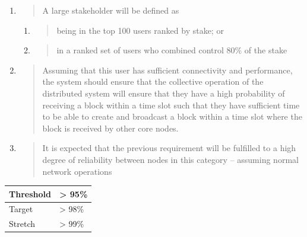 \documentclass[]{article}
\begin{document}
\begin{enumerate}
\def\labelenumi{\arabic{enumi}.}
\item
  \begin{quote}
  A large stakeholder will be defined as
  \end{quote}

  \begin{enumerate}
  \def\labelenumii{\alph{enumii}.}
  \item
    \begin{quote}
    being in the top 100 users ranked by stake; or
    \end{quote}
  \item
    \begin{quote}
    in a ranked set of users who combined control 80\% of the stake
    \end{quote}
  \end{enumerate}
\item
  \begin{quote}
  Assuming that this user has sufficient connectivity and performance,
  the system should ensure that the collective operation of the
  distributed system will ensure that they have a high probability of
  receiving a block within a time slot such that they have sufficient
  time to be able to create and broadcast a block within a time slot
  where the block is received by other core nodes.
  \end{quote}
\item
  \begin{quote}
  It is expected that the previous requirement will be fulfilled to a
  high degree of reliability between nodes in this category -- assuming
  normal network operations
  \end{quote}
\end{enumerate}

\begin{longtable}[]{@{}ll@{}}
\toprule
Threshold & \textgreater{} 95\%\tabularnewline
\midrule
\endhead
Target & \textgreater{} 98\%\tabularnewline
Stretch & \textgreater{} 99\%\tabularnewline
\bottomrule
\end{longtable}
\end{document}

